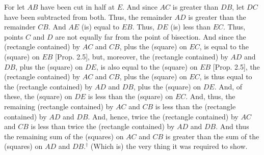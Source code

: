 \begin{Parallel}{}{}
{ For let $AB$ have been cut in half at $E$. And since $AC$ is greater than
 $DB$, let $DC$ have been subtracted from both. Thus, the remainder
 $AD$ is greater than the remainder $CB$. And $AE$ (is) equal to $EB$.
 Thus, $DE$ (is) less than $EC$. Thus, points $C$ and $D$ are not
 equally far from the point of bisection. And since the (rectangle
 contained) by $AC$ and $CB$, plus the (square) on $EC$,
 is equal to the (square) on $EB$ [Prop. 2.5], 
 but, moreover, the (rectangle contained) by $AD$ and $DB$, plus the
 (square) on $DE$, is also equal to the (square) on $EB$ [Prop. 2.5], the (rectangle contained) by $AC$ and
 $CB$, plus the (square) on $EC$, is thus equal to the (rectangle contained)
 by $AD$ and $DB$, plus the (square) on $DE$. And, of these, the
 (square) on $DE$ is less than the (square) on $EC$. And, thus, the remaining
 (rectangle contained) by $AC$ and $CB$ is  less than
 the (rectangle contained) by $AD$ and $DB$. And, hence, twice
 the (rectangle contained) by $AC$ and $CB$ is less than twice the
 (rectangle contained) by $AD$ and $DB$. And thus the remaining
 sum of the (squares) on $AC$ and $CB$ is greater than the sum of the
 (squares) on $AD$ and $DB$.$^\dag$  (Which is) the very thing it was required to show.}
\end{Parallel}



